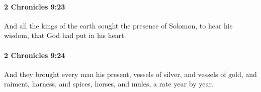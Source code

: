 		\paragraph{2 Chronicles 9:23} %
			\label{2CHRONICLES-9-23}

			And all the kings of the earth sought the presence of Solomon, to hear his wisdom, that God had put in his heart.


		\paragraph{2 Chronicles 9:24} %
			\label{2CHRONICLES-9-24}

			And they brought every man his present, vessels of silver, and vessels of gold, and raiment, harness, and spices, horses, and mules, a rate year by year.


